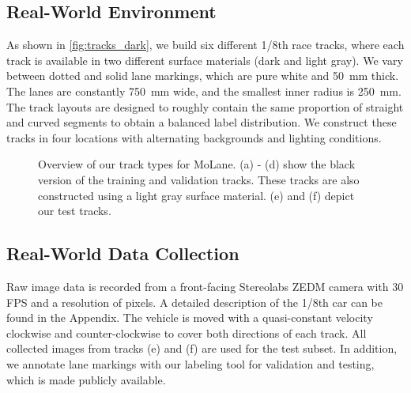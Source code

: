 \documentclass{article}
\begin{document}
	\subsection{Real-World Environment}
	As shown in \autoref{fig:tracks_dark}, we build six different 1/8th race tracks, where each track is available in two different surface materials (dark and light gray). We vary between dotted and solid lane markings, which are pure white and \SI{50}{\milli\metre} thick. The lanes are constantly \SI{750}{\milli\metre} wide, and the smallest inner radius is \SI{250}{\milli\metre}. The track layouts are designed to roughly contain the same proportion of straight and curved segments to obtain a balanced label distribution. We construct these tracks in four locations with alternating backgrounds and lighting conditions. 
	
	\begin{figure}
		\centering
		\hspace*{0.1cm}
		\hspace*{-1.7cm}
		\hspace*{0.1cm}
		\hspace*{0.1cm}
		\caption{Overview of our track types for MoLane. (a) - (d) show the black version of the training and validation tracks. These tracks are also constructed using a light gray surface material. (e) and (f) depict our test tracks.}
		\label{fig:tracks_dark}
	\end{figure}
	
	\subsection{Real-World Data Collection}
	Raw image data is recorded from a front-facing Stereolabs ZEDM camera with 30 FPS and a resolution of  pixels. A detailed description of the 1/8th car can be found in the Appendix. The vehicle is moved with a quasi-constant velocity clockwise and counter-clockwise to cover both directions of each track. All collected images from tracks (e) and (f) are used for the test subset. In addition, we annotate lane markings with our labeling tool for validation and testing, which is made publicly available.
	
\end{document}
